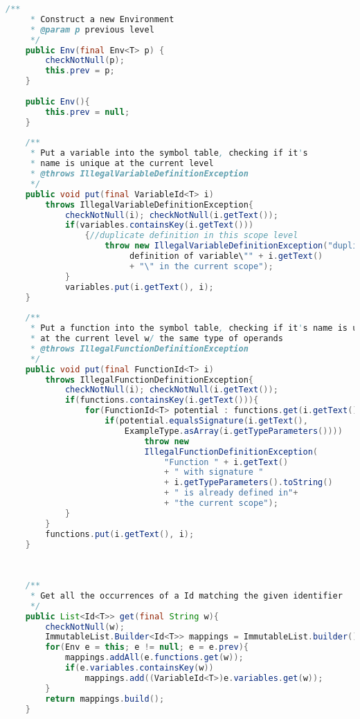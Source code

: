 \begin{lstlisting}[language=Java]
	/**
	 * Construct a new Environment
	 * @param p previous level
	 */
	public Env(final Env<T> p) {
		checkNotNull(p);
		this.prev = p; 
	}
	
	public Env(){
		this.prev = null;
	}
	
	/**
	 * Put a variable into the symbol table, checking if it's 
     * name is unique at the current level
	 * @throws IllegalVariableDefinitionException 
	 */
	public void put(final VariableId<T> i) 
        throws IllegalVariableDefinitionException{
    		checkNotNull(i); checkNotNull(i.getText());
    		if(variables.containsKey(i.getText()))
                {//duplicate definition in this scope level
        			throw new IllegalVariableDefinitionException("duplicate
                         definition of variable\"" + i.getText()    
                         + "\" in the current scope");
    		}
    		variables.put(i.getText(), i);
	}
	
	/**
	 * Put a function into the symbol table, checking if it's name is unique 
     * at the current level w/ the same type of operands
	 * @throws IllegalFunctionDefinitionException 
	 */
	public void put(final FunctionId<T> i) 
        throws IllegalFunctionDefinitionException{
    		checkNotNull(i); checkNotNull(i.getText());
    		if(functions.containsKey(i.getText())){
    			for(FunctionId<T> potential : functions.get(i.getText())){
    				if(potential.equalsSignature(i.getText(), 
                        ExampleType.asArray(i.getTypeParameters())))
        					throw new 
                            IllegalFunctionDefinitionException(
                                "Function " + i.getText() 
                                + " with signature " 
                                + i.getTypeParameters().toString() 
                                + " is already defined in"+
                                + "the current scope");		
			}
		}
		functions.put(i.getText(), i);
	}
	
	
	
	/**
	 * Get all the occurrences of a Id matching the given identifier
	 */
	public List<Id<T>> get(final String w){
		checkNotNull(w);
		ImmutableList.Builder<Id<T>> mappings = ImmutableList.builder();
		for(Env e = this; e != null; e = e.prev){
			mappings.addAll(e.functions.get(w));
			if(e.variables.containsKey(w))
				mappings.add((VariableId<T>)e.variables.get(w));
		}
		return mappings.build();
	}
	

\end{lstlisting}
